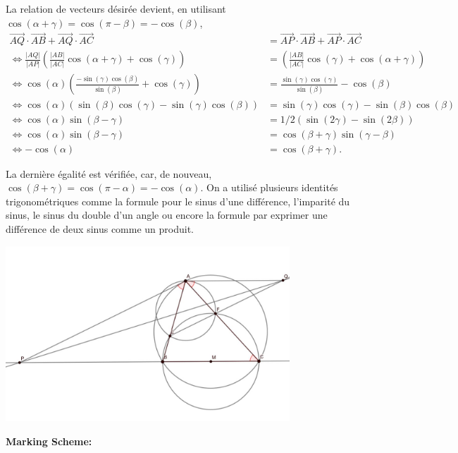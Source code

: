 La relation de vecteurs désirée devient, en utilisant $\cos(\alpha+\gamma)=\cos(\pi-\beta)=-\cos(\beta)$, 
\begin{align*}
\vec {AQ}\cdot \vec{AB}+\vec{AQ}\cdot\vec{AC}&=\vec{AP}\cdot \vec{AB}+\vec{AP}\cdot\vec{AC}\\
\Leftrightarrow\frac{|AQ|}{|AP|}\left(\frac{|AB|}{|AC|}\cos(\alpha+\gamma)+\cos(\gamma)\right)&=\left(\frac{|AB|}{|AC|}\cos(\gamma)+\cos(\alpha+\gamma)\right)\\
\Leftrightarrow \cos(\alpha)\left(\frac{-\sin(\gamma)\cos(\beta)}{\sin(\beta)}+\cos(\gamma)\right)&=\frac{\sin(\gamma)\cos(\gamma)}{\sin(\beta)}-\cos(\beta)\\
\Leftrightarrow \cos(\alpha)(\sin(\beta)\cos(\gamma)-\sin(\gamma)\cos(\beta))&=\sin(\gamma)\cos(\gamma)-\sin(\beta)\cos(\beta)\\
\Leftrightarrow \cos(\alpha)\sin(\beta-\gamma)&=1/2(\sin(2\gamma)-\sin(2\beta))\\
\Leftrightarrow \cos(\alpha)\sin(\beta-\gamma)&=\cos(\beta+\gamma)\sin(\gamma-\beta)\\
\Leftrightarrow -\cos(\alpha)&=\cos(\beta+\gamma).
\end{align*}

La dernière égalité est vérifiée, car, de nouveau, $\cos(\beta+\gamma)=\cos(\pi-\alpha)=-\cos(\alpha)$. On a utilisé plusieurs identités trigonométriques comme la formule pour le sinus d'une différence, l'imparité du sinus, le sinus du double d'un angle ou encore la formule par exprimer une différence de deux sinus comme un produit.

\includegraphics[width = 0.8\textwidth]{solutions/s9_picture.JPG}

\newpage
\textbf{Marking Scheme:}

